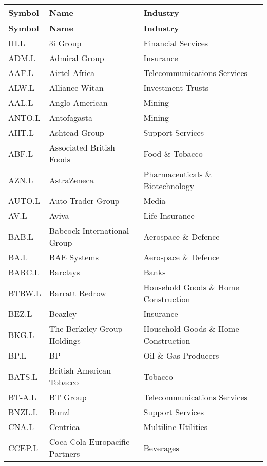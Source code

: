 \begin{longtable}{|p{2cm}|p{4cm}|p{6cm}|}
\hline
\textbf{Symbol} & \textbf{Name} & \textbf{Industry} \\ \midrule
\endfirsthead

\hline
\textbf{Symbol} & \textbf{Name} & \textbf{Industry} \\ \midrule
\endhead

\endfoot

\hline
III.L & 3i Group & Financial Services \\ \hline
ADM.L & Admiral Group & Insurance \\ \hline
AAF.L & Airtel Africa & Telecommunications Services \\ \hline
ALW.L & Alliance Witan & Investment Trusts \\ \hline
AAL.L & Anglo American & Mining \\ \hline
ANTO.L & Antofagasta & Mining \\ \hline
AHT.L & Ashtead Group & Support Services \\ \hline
ABF.L & Associated British Foods & Food \& Tobacco \\ \hline
AZN.L & AstraZeneca & Pharmaceuticals \& Biotechnology \\ \hline
AUTO.L & Auto Trader Group & Media \\ \hline
AV.L & Aviva & Life Insurance \\ \hline
BAB.L & Babcock International Group & Aerospace \& Defence \\ \hline
BA.L & BAE Systems & Aerospace \& Defence \\ \hline
BARC.L & Barclays & Banks \\ \hline
BTRW.L & Barratt Redrow & Household Goods \& Home Construction \\ \hline
BEZ.L & Beazley & Insurance \\ \hline
BKG.L & The Berkeley Group Holdings & Household Goods \& Home Construction \\ \hline
BP.L & BP & Oil \& Gas Producers \\ \hline
BATS.L & British American Tobacco & Tobacco \\ \hline
BT-A.L & BT Group & Telecommunications Services \\ \hline
BNZL.L & Bunzl & Support Services \\ \hline
CNA.L & Centrica & Multiline Utilities \\ \hline
CCEP.L & Coca-Cola Europacific Partners & Beverages \\ \hline

\end{longtable}
